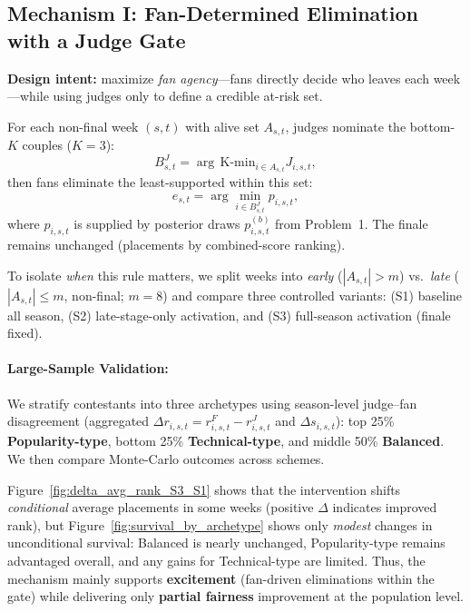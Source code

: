 \documentclass[12pt]{article}
\begin{document}
\subsection{Mechanism I: Fan-Determined Elimination with a Judge Gate}

\noindent\textbf{Design intent:} maximize \emph{fan agency}---fans directly decide who leaves each week---while using judges only to define a credible at-risk set.

For each non-final week $(s,t)$ with alive set $A_{s,t}$, judges nominate the bottom-$K$ couples ($K=3$):
\begin{equation}
B^{J}_{s,t}=\arg\,\text{K-min}_{i\in A_{s,t}} J_{i,s,t},
\end{equation}
then fans eliminate the least-supported within this set:
\begin{equation}
e_{s,t}=\arg\min_{i\in B^{J}_{s,t}} p_{i,s,t},
\end{equation}
where $p_{i,s,t}$ is supplied by posterior draws $p^{(b)}_{i,s,t}$ from Problem~1. The finale remains unchanged (placements by combined-score ranking).

To isolate \emph{when} this rule matters, we split weeks into \emph{early} ($|A_{s,t}|>m$) vs.\ \emph{late} ($|A_{s,t}|\le m$, non-final; $m=8$) and compare three controlled variants: (S1) baseline all season, (S2) late-stage-only activation, and (S3) full-season activation (finale fixed).


\paragraph{Large-Sample Validation:}
We stratify contestants into three archetypes using season-level judge--fan disagreement (aggregated $\Delta r_{i,s,t}=r^F_{i,s,t}-r^J_{i,s,t}$ and $\Delta s_{i,s,t}$): top 25\% \textbf{Popularity-type}, bottom 25\% \textbf{Technical-type}, and middle 50\% \textbf{Balanced}. We then compare Monte-Carlo outcomes across schemes.

Figure~\ref{fig:delta_avg_rank_S3_S1} shows that the intervention shifts \emph{conditional} average placements in some weeks (positive $\Delta$ indicates improved rank), but Figure~\ref{fig:survival_by_archetype} shows only \emph{modest} changes in unconditional survival: Balanced is nearly unchanged, Popularity-type remains advantaged overall, and any gains for Technical-type are limited. Thus, the mechanism mainly supports \textbf{excitement} (fan-driven eliminations within the gate) while delivering only \textbf{partial fairness} improvement at the population level.
\end{document}
